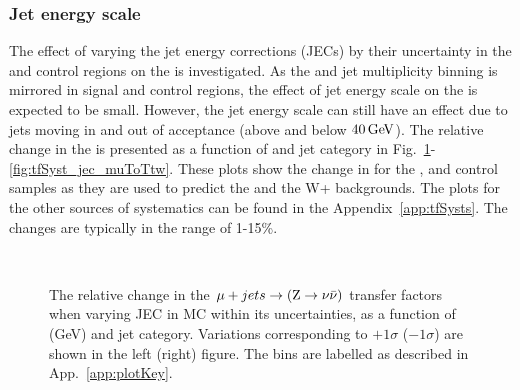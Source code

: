 \subsubsection*{Jet energy scale}
\label{sec:tfSyst_jec}
The effect of varying the jet energy corrections (JECs) by their uncertainty
in the \mj and \mmj control regions on the \TFs is investigated.  As
the \scalht and jet multiplicity binning is mirrored in signal and
control regions, the effect of jet energy scale on the \TFs
is expected to be small.  However, the jet energy scale can still have
an effect due to jets moving in and out of acceptance (above and below
$40\mathrm{\,Ge\kern -0.1em V}$). The relative change in the \TFs is presented as
a function of \scalht and jet category in
Fig.~\ref{fig:tfSyst_jec_muToZinv}-\ref{fig:tfSyst_jec_muToTtw}. These
plots show the change in \TFs for the \mj, \mmj and \gj control
samples as they are used to predict the \znunu and the W+\ttbar
backgrounds. The plots for the other sources of systematics can be
found in the Appendix~\ref{app:tfSysts}. The
changes are typically in the range of 1-15\%.

\begin{figure}[!h]
  \centering
   ~~
  \\

  \caption{\label{fig:tfSyst_jec_muToZinv} The relative change in the
  $\mu + jets \rightarrow ({\text Z} \rightarrow \nu\bar{\nu})$ transfer
  factors when varying JEC in MC within its uncertainties, as a
  function of \scalht (GeV) and jet category.
  Variations corresponding to $+1\sigma$ ($-1\sigma$) are shown in the left (right) figure. The bins are
  labelled as described in App.~\ref{app:plotKey}.
  }
\end{figure}


